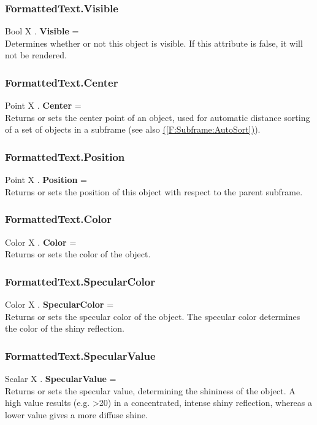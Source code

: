 \documentclass[10pt]{book}
\newcommand{\linkitem}[1]{\hyperref[#1]{\nameref{#1} (\ref{#1})}}
\begin{document}
\subsubsection{FormattedText.Visible \label{F:FormattedText:Visible}}
Bool X . \textbf{Visible} = \\
Determines whether or not this object is visible. If this attribute is false, it will not be rendered.

\subsubsection{FormattedText.Center \label{F:FormattedText:Center}}
Point X . \textbf{Center} = \\
Returns or sets the center point of an object, used for automatic distance sorting of a set of objects in a subframe (see also \linkitem{F:Subframe:AutoSort}).

\subsubsection{FormattedText.Position \label{F:FormattedText:Position}}
Point X . \textbf{Position} = \\
Returns or sets the position of this object with respect to the parent subframe.

\subsubsection{FormattedText.Color \label{F:FormattedText:Color}}
Color X . \textbf{Color} = \\
Returns or sets the color of the object.

\subsubsection{FormattedText.SpecularColor \label{F:FormattedText:SpecularColor}}
Color X . \textbf{SpecularColor} = \\
Returns or sets the specular color of the object. The specular color determines the color of the shiny reflection.

\subsubsection{FormattedText.SpecularValue \label{F:FormattedText:SpecularValue}}
Scalar X . \textbf{SpecularValue} = \\
Returns or sets the specular value, determining the shininess of the object. A high value results (e.g. >20) in a concentrated, intense shiny reflection, whereas a lower value gives a more diffuse shine.
\end{document}
